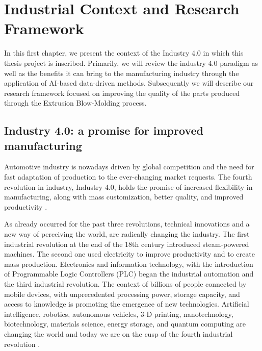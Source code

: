 \chapter{Industrial Context and Research Framework}
\minitoc

In this first chapter, we present the context of the Industry 4.0 in which this thesis project is inscribed. Primarily, we will review the industry 4.0 paradigm as well as the benefits it can bring to the manufacturing industry through the application of AI-based data-driven methods. Subsequently we will describe our research framework focused on improving the quality of the parts produced through the Extrusion Blow-Molding process. 

\section{Industry 4.0: a promise for improved manufacturing}

Automotive industry is nowadays driven by global competition and the need for fast adaptation of production to the ever-changing market requests. The fourth revolution in industry, Industry 4.0, holds the promise of increased flexibility in manufacturing, along with mass customization, better quality, and improved productivity \citep{zhong2017intelligent}. 

As already occurred for the past three revolutions, technical innovations and a new way of perceiving the world, are radically changing the industry. The first industrial revolution at the end of the 18th century introduced steam-powered machines. The second one used electricity to improve productivity and to create mass production. Electronics and information technology, with the introduction of Programmable Logic Controllers (PLC) began the industrial automation and the third industrial revolution. The context of billions of people connected by mobile devices, with unprecedented processing power, storage capacity, and access to knowledge is promoting the emergence of new technologies. Artificial intelligence, robotics, autonomous vehicles, 3-D printing, nanotechnology, biotechnology, materials science, energy storage, and quantum computing are changing the world and today we are on the cusp of the fourth industrial revolution \citep{schwab20164th}.  

